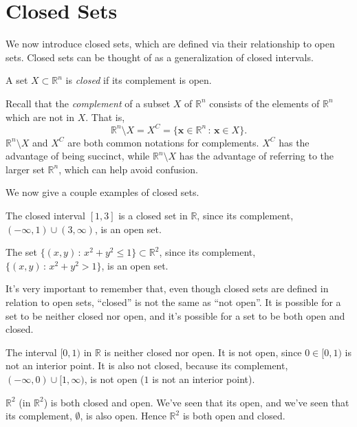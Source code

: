 \documentclass{ximera}
\begin{document}
\section*{Closed Sets}

We now introduce closed sets, which are defined via their relationship to open sets. Closed sets can be thought of as a generalization of closed intervals.

\begin{definition}
A set $X\subset \mathbb{R}^n$ is \emph{closed} if its complement is open.
\end{definition}

Recall that the \emph{complement} of a subset $X$ of $\mathbb{R}^n$ consists of the elements of $\mathbb{R}^n$ which are not in $X$. That is,
\[
\mathbb{R}^n\setminus X = X^C = \{\mathbf{x}\in\mathbb{R}^n\,:\,\mathbf{x}\in X\}.
\]
$\mathbb{R}^n\setminus X$ and $X^C$ are both common notations for complements. $X^C$ has the advantage of being succinct, while $\mathbb{R}^n\setminus X$ has the advantage of referring to the larger set $\mathbb{R}^n$, which can help avoid confusion.

We now give a couple examples of closed sets.

\begin{example}

The closed interval $[1,3]$ is a closed set in $\mathbb{R}$, since its complement, $(-\infty, 1)\cup (3,\infty)$, is an open set.

The set $\{(x,y)\,:\,x^2+y^2\leq 1\}\subset \mathbb{R}^2$, since its complement, $\{(x,y)\,:\,x^2+y^2> 1\}$, is an open set.

\end{example}

It's very important to remember that, even though closed sets are defined in relation to open sets, {\color{red}``closed'' is not the same as ``not open''}. It is possible for a set to be neither closed nor open, and it's possible for a set to be both open and closed.

\begin{example}

The interval $[0,1)$ in $\mathbb{R}$ is neither closed nor open. It is not open, since $0\in [0,1)$ is not an interior point. It is also not closed, because its complement, $(-\infty, 0)\cup [1,\infty)$, is not open ($1$ is not an interior point).

$\mathbb{R}^2$ (in $\mathbb{R}^2$) is both closed and open. We've seen that its open, and we've seen that its complement, $\emptyset$, is also open. Hence $\mathbb{R}^2$ is both open and closed.

\end{example} 
\end{document}
